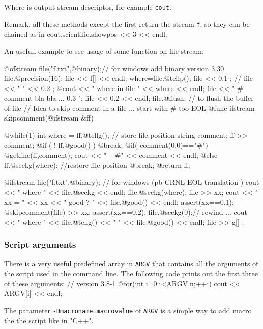 \documentclass[a4paper,twoside,12pt]{book}
\def\n{\nabla}
\def\setS#1{#1\label{sec:#1}}
\begin{document}
\begin{example}
\begin{itemize}
\end{itemize}
Where  is output stream descriptor, for example \texttt{cout}.

Remark, all these methods except the first return the stream \texttt{f}, so they can be chained as in
\bFF
    cout.scientific.showpos << 3 << endl;
\eFF

An usefull example to see usage of some  function on file stream: 

\bFF
{ 
  @ofstream file("f.txt",@binary);// for windows add binary version 3.30 
  file.@precision(16);
  file << f[] << endl;
  where=file.@tellp();
  file << 0.1 ;
  //  file << " " << 0.2 ;
  @cout << " where in file " << where << endl;
  file << " # comment bla bla ...  0.3 \n";
  file << 0.2 << endl; 
  file.@flush; // to flush the buffer of file
}
//  Idea to skip comment in a file ...  start with  # too EOL
@func ifstream skipcomment(@ifstream &ff)
{
    
    @while(1)
    {
    int where = ff.@tellg(); // store file position 
    string comment;
    ff >> comment; 
    @if ( ! ff.@good() ) @break; 
    @if( comment(0:0)=="#") {
         @getline(ff,comment);
         cout << " -- #" << comment << endl;
    }
    @else {
        ff.@seekg(where); //restore file position 
        @break;        
    }    
    }
    @return ff;
}
{
  @ifstream file("f.txt",@binary); // for windows (pb CRNL EOL  translation ) 
  cout << " where " << file.@seekg << endl; 
  file.@seekg(where);
  file >> xx;
  cout <<  " xx = " << xx << " good ? " << file.@good() << endl;
  assert(xx==0.1);
  @skipcomment(file) >> xx;
  assert(xx==0.2);
  file.@seekg(0);//  rewind ...
  cout << " where " << file.@tellg() << " " << file.@good() << endl; 
  file >> g[] ;
}
\eFF

\subsubsection{\setS{Script arguments}}
There is a very useful predefined array in \freefempp \texttt{ARGV} that contains all the arguments of the script used in the command line. The following code prints out the first three of these arguments: 
\bFF
//  version 3.8-1
@for(int i=0;i<ARGV.n;++i)
  {
    cout << ARGV[i] << endl;
  }
\eFF
\end{example}

The parameter    \texttt{-Dmacroname=macrovalue}  of \texttt{ARGV} is a simple way to add macro the the script like in "C++". 
\end{document}
